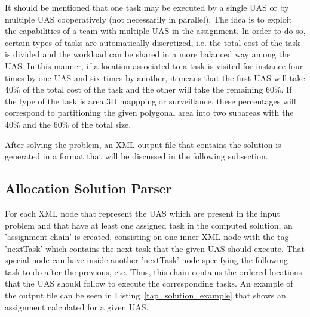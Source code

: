 \documentclass[twocolumn]{svjour3}          %
\begin{document}


It should be mentioned that one task may be executed by a single UAS or by multiple UAS cooperatively (not necessarily in parallel). The idea is to exploit the capabilities of a team with multiple UAS in the assignment. In order to do so, certain types of tasks are automatically discretized, i.e. the total cost of the task is divided and the workload can be shared in a more balanced way among the UAS. In this manner, if a location associated to a task is visited for instance four times by one UAS and six times by another, it means that the first UAS will take 40\% of the total cost of the task and the other will take the remaining 60\%. If the type of the task is area 3D mappping or surveillance, these percentages will correspond to partitioning the given polygonal area into two subareas with the 40\% and the 60\% of the total size.

After solving the problem, an XML output file that contains the solution is generated in a format that will be discussed in the following subsection. 

\subsection{Allocation Solution Parser}
    \label{sec:sop}

For each XML node that represent the UAS which are present in the input problem and that have at least one assigned task in the computed solution, an 'assignment chain' is created, consisting on one inner XML node with the tag 'nextTask' which contains the next task that the given UAS should execute. That special node can have inside another 'nextTask' node specifying the following task to do after the previous, etc. Thus, this chain contains the ordered locations that the UAS should follow to execute the corresponding tasks. An example of the output file can be seen in Listing~\ref{tap_solution_example} that shows an assignment calculated for a given UAS.


\end{document}
